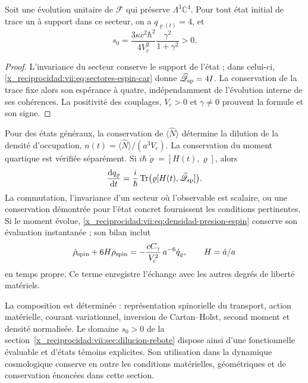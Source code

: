\begin{corollary}
\label{x_reciprocidad:vii:cor:dominio-positivo-conservado}
Soit une évolution unitaire de \(\mathcal F\) qui préserve
\(\Lambda^3\mathbb C^4\). Pour tout état initial de trace un
à support dans ce secteur, on a \(q_{\varrho(t)}=4\), et
\begin{equation}
 s_0=\frac{3\kappa c^2\hbar^2}{4V_c^2}
                   \frac{\gamma^2}{1+\gamma^2}>0.
 \label{x_reciprocidad:vii:eq:amplitud-positiva-sector-tres}
\end{equation}
\end{corollary}
\begin{proof}
L'invariance du secteur conserve le support de l'état ; dans celui-ci,
\eqref{x_reciprocidad:vii:eq:sectores-espin-car} donne
\(\widehat{\mathscr Q}_{\rm sp}=4I\). La conservation de la
trace fixe alors son espérance à quatre, indépendamment de
l'évolution interne de ses cohérences. La positivité des
couplages, \(V_c>0\) et \(\gamma\ne0\) prouvent la formule
et son signe.
\end{proof}

Pour des états généraux, la conservation de
\(\langle\widehat N\rangle\) détermine la dilution de la densité
d'occupation, \(n(t)=\langle\widehat N\rangle/(a^3V_c)\).
La conservation du moment quartique est vérifiée séparément.
Si \(i\hbar\dot\varrho=[H(t),\varrho]\), alors
\begin{equation}
 \frac{\mathrm d q_\varrho}{\mathrm dt}
 =\frac{i}{\hbar}\operatorname{Tr}
       \bigl(\varrho[H(t),\widehat{\mathscr Q}_{\rm sp}]\bigr).
 \label{x_reciprocidad:vii:eq:conservacion-momento-cuartico}
\end{equation}
La commutation, l'invariance d'un secteur où l'observable est scalaire, ou une conservation démontrée pour l'état concret fournissent les conditions pertinentes. Si le moment évolue, \eqref{x_reciprocidad:vii:eq:densidad-presion-espin} conserve son évaluation instantanée ; son bilan inclut
\[
 \dot\rho_{\rm spin}+6H\rho_{\rm spin}
 =-\frac{cC_\gamma}{V_c^2}\,a^{-6}\dot q_\varrho,
 \qquad H=\dot a/a
\]
en temps propre. Ce terme enregistre l'échange avec les
autres degrés de liberté matériels.

La composition est déterminée : représentation spinorielle du
transport, action matérielle, courant variationnel, inversion de
Cartan--Holst, second moment et densité normalisée. Le domaine
\(s_0>0\) de la section~\ref{x_reciprocidad:vii:sec:dilucion-rebote} dispose ainsi
d'une fonctionnelle évaluable et d'états témoins explicites. Son utilisation dans
la dynamique cosmologique conserve en outre les conditions matérielles,
géométriques et de conservation énoncées dans cette section.

